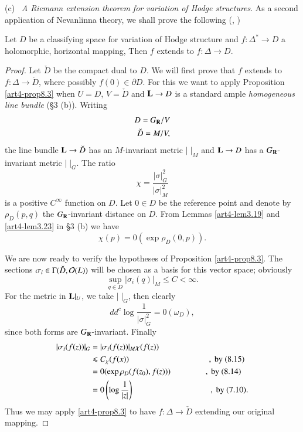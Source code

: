\noindent
(c)~ \textit{A Riemann extension theorem for variation of Hodge structures}. As a second application of Nevanlinna theory, we shall prove the following (\cf \cite{art4-key19}, \cite{art4-key41})

\begin{proposition}\label{art4-prop8.13}
Let $D$ be a classifying space for variation of Hodge structure and $f : \Delta^\ast \to D$ a holomorphic, horizontal mapping, Then $f$ extends to $f: \Delta \to D$.
\end{proposition}

\begin{proof}
Let $\check{D}$ be the compact dual to $D$. We will first prove that $f$ extends to $f : \Delta \to \check{D}$, where possibly $f(0) \in \partial D$. For this we want to apply Proposition \eqref{art4-prop8.3} when $U = D$, $V = \check{D}$ and $\mathbf{L}\to D$ is a standard ample \textit{homogeneous line bundle} (\cf \S 3 (b)). Writing 
\begin{align*}
D = G_{\mathbf{R}} / V\\
\check{D} = M/V,
\end{align*}\pageoriginale
the line bundle $\mathbf{L} \to \check{D}$ has an $M$-invariant metric $|\;|_M$ and $\mathbf{L} \to D$ has a $G_{\mathbf{R}}$-invariant metric $|\;|_G$. The ratio
$$
\chi = \frac{|\sigma|^2_G}{|\sigma|^2_M}
$$
is a positive $C^\infty$ function on $D$. Let $0 \in D$ be the reference point and denote by $\rho_D (p,q)$ the $G_{\mathbf{R}}$-invariant distance on $D$. From Lemmas \ref{art4-lem3.19} and \ref{art4-lem3.23} in \S 3 (b) we have 
\begin{equation}
\chi(p) = 0 (\exp \rho_D (0, p)) . 
\label{art4-eq8.14}
\end{equation}

We are now ready to verify the hypotheses of Proposition \ref{art4-prop8.3}. The sections $\sigma_i \in \Gamma (\check{D}, \mathcal{O} (L))$ will be chosen as a basis for this vector space; obviously
\begin{equation}
\sup_{q \in D} |\sigma_i (q)|_M \leqslant C < \infty. 
\label{art4-eq8.15}
\end{equation}
For the metric in $\mathbf{L}|_U$, we take $|\;|_G$, then  clearly
$$
dd^c \log \frac{1}{|\sigma|^2_G} = 0 (\omega_D),
$$
since both forms are $G_{\mathbf{R}}$-invariant. Finally
\begin{align*}
|\sigma_i (f(z))|_G & = |\sigma_i (f(z))|_{M} \chi (f(z))\\
& \leqslant C_\chi (f(x)) \hspace{3.43cm}, \text{ by (8.15)}\\
& = 0 (\exp \rho_D (f(z_0), f(z))) \hspace{1.5cm}, \text{ by (8.14)}\\
& = 0 \left( \log \frac{1}{|z|}\right) \hspace{3.3cm}, \text{ by (7.10)}.
\end{align*}
Thus we may apply \eqref{art4-prop8.3} to have $f: \Delta \to \check{D}$ extending our original mapping.


\end{proof}
